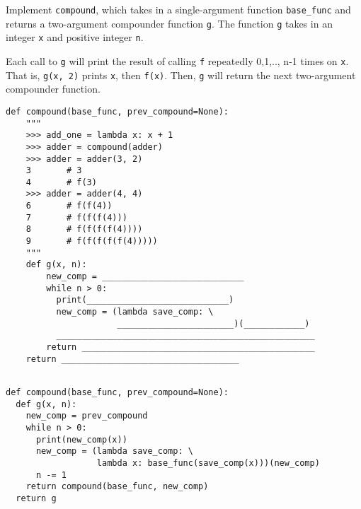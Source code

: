 \begin{blocksection}
\question Implement \texttt{compound}, which takes in a single-argument function \texttt{base\_func} and returns a two-argument compounder function \texttt{g}. The function \texttt{g} takes in an integer \texttt{x} and positive integer \texttt{n}.

Each call to \texttt{g} will print the result of calling \texttt{f} repeatedly 0,1,.., n-1 times on \texttt{x}. That is, \texttt{g(x, 2)} prints \texttt{x}, then \texttt{f(x)}. Then, \texttt{g} will return the next two-argument compounder function.

\begin{lstlisting}
def compound(base_func, prev_compound=None):
    """
    >>> add_one = lambda x: x + 1
    >>> adder = compound(adder)
    >>> adder = adder(3, 2)
    3       # 3
    4       # f(3)
    >>> adder = adder(4, 4)
    6       # f(f(4))
    7       # f(f(f(4)))
    8       # f(f(f(f(4))))
    9       # f(f(f(f(f(4)))))
    """
    def g(x, n):
        new_comp = ____________________________
        while n > 0:
          print(____________________________)
          new_comp = (lambda save_comp: \
                      _______________________)(____________)
          ___________________________________________________
        return ______________________________________________
    return ___________________________________
    
\end{lstlisting}

\begin{solution}[1in]
\begin{lstlisting}
def compound(base_func, prev_compound=None):
  def g(x, n):
    new_comp = prev_compound
    while n > 0:
      print(new_comp(x))
      new_comp = (lambda save_comp: \
                  lambda x: base_func(save_comp(x)))(new_comp)
      n -= 1
    return compound(base_func, new_comp)
  return g
\end{lstlisting}
\end{solution}
\end{blocksection}